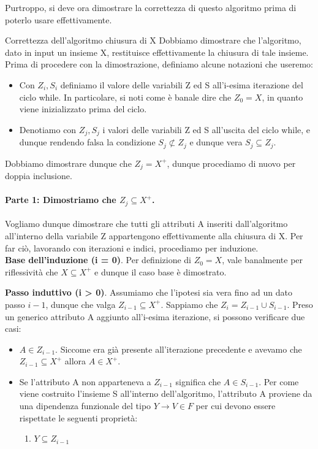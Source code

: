 \documentclass[12pt]{report}
\newcommand{\ra}{
	\rightarrow
}
\begin{document}
	Purtroppo, si deve ora dimostrare la correttezza di questo algoritmo prima di poterlo usare effettivamente.
	\begin{dimostrazione}{Correttezza dell'algoritmo chiusura di X}{}
		Dobbiamo dimostrare che l'algoritmo, dato in input un insieme X, restituisce effettivamente la chiusura di tale insieme. Prima di procedere con la dimostrazione, definiamo alcune notazioni che useremo:
		\begin{itemize}
			\item Con $Z_i, S_i$ definiamo il valore delle variabili Z ed S all'i-esima iterazione del ciclo while. In particolare, si noti come è banale dire che $Z_0 = X$, in quanto viene inizializzato prima del ciclo.
			
			\item Denotiamo con $Z_j, S_j$ i valori delle variabili Z ed S all'uscita del ciclo while, e dunque rendendo falsa la condizione $S_j \not\subset Z_j$ e dunque vera $S_j \subseteq Z_j$.
		\end{itemize}
		Dobbiamo dimostrare dunque che $Z_j = X^+$, dunque procediamo di nuovo per doppia inclusione.
		
		\paragraph{Parte 1: Dimostriamo che $Z_j \subseteq X^+$.} Vogliamo dunque dimostrare che tutti gli attributi A inseriti dall'algoritmo all'interno della variabile Z appartengono effettivamente alla chiusura di X. Per far ciò, lavorando con iterazioni e indici, procediamo per induzione.\\
		\textbf{Base dell'induzione (i = 0)}. Per definizione di $Z_0 = X$, vale banalmente per riflessività che $X \subseteq X^+$ e dunque il caso base è dimostrato.
		
		\textbf{Passo induttivo (i > 0)}. Assumiamo che l'ipotesi sia vera fino ad un dato passo $i-1$, dunque che valga $Z_{i-1} \subseteq X^+$. Sappiamo che $Z_i = Z_{i-1} \cup S_{i-1}$. Preso un generico attributo A aggiunto all'i-esima iterazione, si possono verificare due casi:
		\begin{itemize}
			\item $A \in Z_{i-1}$. Siccome era già presente all'iterazione precedente e avevamo che $Z_{i-1} \subseteq X^+$ allora $A \in X^+$.
			
			\item Se l'attributo A non apparteneva a $Z_{i-1}$ significa che $A \in S_{i-1}$. Per come viene costruito l'insieme S all'interno dell'algoritmo, l'attributo A proviene da una dipendenza funzionale del tipo $Y \ra V \in F$ per cui devono essere rispettate le seguenti proprietà:
			\begin{enumerate}
				\item $Y \subseteq Z_{i-1}$
				

\end{enumerate}
\end{itemize}
\end{dimostrazione}
\end{document}
